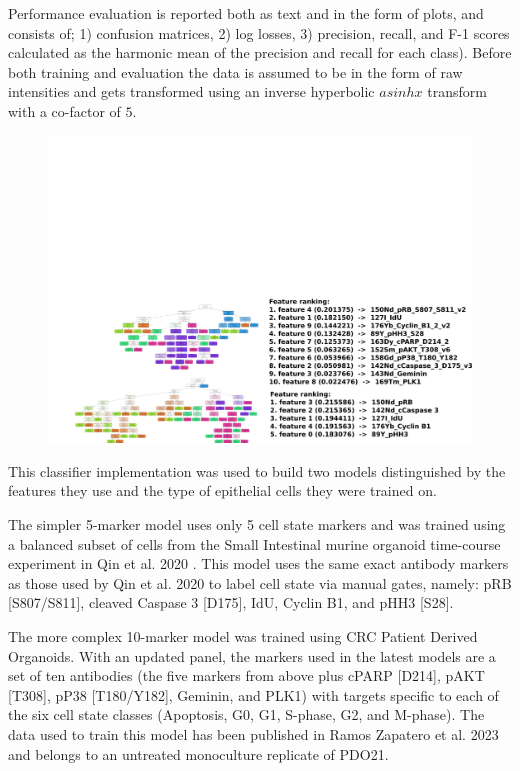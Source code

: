 Performance evaluation is reported both as text and in the form of plots, and consists of; 1) confusion matrices, 2) log losses, 3) precision, recall, and F-1 scores calculated as the harmonic mean of the precision and recall for each class). Before both training and evaluation the data is assumed to be in the form of raw intensities and gets transformed using an inverse hyperbolic \(asinh x\) transform with a co-factor of \(5\). 

\begin{figure}
    \centering
    \includegraphics{02methods/figs/2CYTOF_trainRFclass.png}
    \caption{}
    \label{}
\end{figure}

This classifier implementation was used to build two models distinguished by the features they use and the type of epithelial cells they were trained on. 

The simpler 5-marker model uses only 5 cell state markers and was trained using a balanced subset of cells from the Small Intestinal murine organoid time-course experiment in Qin et al. 2020 \cite{qin_cell-type-specific_2020}. This model uses the same exact antibody markers as those used by Qin et al. 2020 to label cell state via manual gates, namely: pRB [S807/S811], cleaved Caspase 3 [D175], IdU, Cyclin B1, and pHH3 [S28].

The more complex 10-marker model was trained using CRC Patient Derived Organoids. With an updated panel, the markers used in the latest models are a set of ten antibodies (the five markers from above plus cPARP [D214], pAKT [T308], pP38 [T180/Y182], Geminin, and PLK1) with targets specific to each of the six cell state classes (Apoptosis, G0, G1, S-phase, G2, and M-phase). The data used to train this model has been published in Ramos Zapatero et al. 2023 \cite{zapatero_trellis_2023} and belongs to an untreated monoculture replicate of PDO21. 

